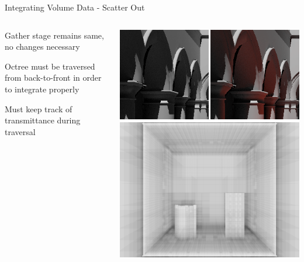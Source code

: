 \documentclass[10pt,compress,professionalfont]{beamer}
\begin{document}
\begin{frame}{Integrating Volume Data - Scatter Out}

    \begin{columns}
        \begin{column}{0.5\textwidth}

    Gather stage remains same, no changes necessary\\
    \vspace{8mm}

    Octree must be traversed from back-to-front in order to integrate properly\\
    \vspace{8mm}

    Must keep track of transmittance during traversal

        \end{column}
        \begin{column}{0.5\textwidth}
            \includegraphics[width=\textwidth]{../img/compare_trad_corrected}\\
            \vspace{2mm}
            \includegraphics[width=\textwidth]{../img/testing}\\
        \end{column}
    \end{columns}

\end{frame}
\end{document}
